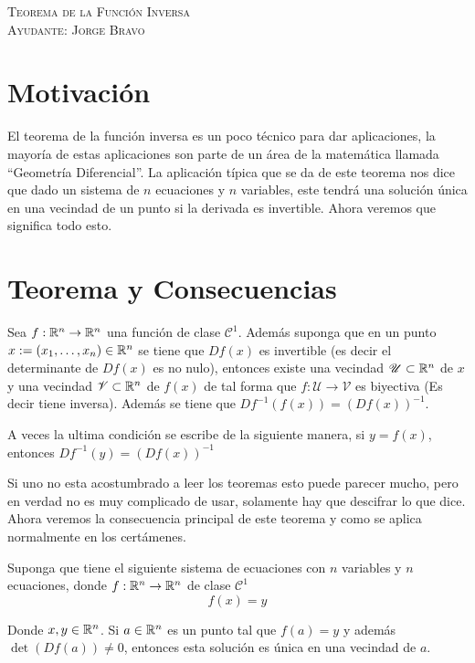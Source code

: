 \documentclass[a4paper,oneside,10.5pt]{article}
\begin{document}
\begin{center}
{\Large \textsc{Teorema de la Función Inversa}}\\
\vspace{1em}
\textsc{Ayudante: Jorge Bravo}\\
\end{center}

\section*{Motivación}
El teorema de la función inversa es un poco técnico para dar aplicaciones, la mayoría de estas aplicaciones son parte de un área de la matemática llamada ``Geometría Diferencial''. La aplicación típica que se da de este teorema nos dice que dado un sistema de $n$ ecuaciones y $n$ variables, este tendrá una solución única en una vecindad de un punto si la derivada es invertible. Ahora veremos que significa todo esto.

\section*{Teorema y Consecuencias}
\begin{teo}
Sea $f : \mathbb{R}^n \to \mathbb{R}^n$ una función de clase $\mathcal{C}^1$. Además suponga que en un punto $x := (x_1, \dots, x_n) \in \mathbb{R}^n$ se tiene que $Df(x)$ es invertible (es decir el determinante de $Df(x)$ es no nulo), entonces existe una vecindad $\mathcal{U} \subset \mathbb{R}^n$ de $x$ y una vecindad $\mathcal{V} \subset \mathbb{R}^n$ de $f(x)$ de tal forma que $f : \mathcal{U} \to \mathcal{V}$ es biyectiva (Es decir tiene inversa). Además se tiene que $Df^{-1}(f(x)) = {(Df(x))}^{-1}$.
\end{teo}

\begin{obs}
    A veces la ultima condición se escribe de la siguiente manera, si $y = f(x)$, entonces $Df^{-1}(y) = {(Df(x))}^{-1}$
\end{obs}

Si uno no esta acostumbrado a leer los teoremas esto puede parecer mucho, pero en verdad no es muy complicado de usar, solamente hay que descifrar lo que dice. Ahora veremos la consecuencia principal de este teorema y como se aplica normalmente en los certámenes.

\begin{coro}
    Suponga que tiene el siguiente sistema de ecuaciones con $n$ variables y $n$ ecuaciones, donde $f: \mathbb{R}^n \to \mathbb{R}^n$ de clase $\mathcal{C}^1$
    \begin{equation*}
        f(x) = y
    \end{equation*}

    Donde $x, y \in \mathbb{R}^n$. Si $a \in \mathbb{R}^n$ es un punto tal que $f(a) = y$ y además $\det(Df(a)) \neq 0$, entonces esta solución es única en una vecindad de $a$.
\end{coro}
\end{document}
